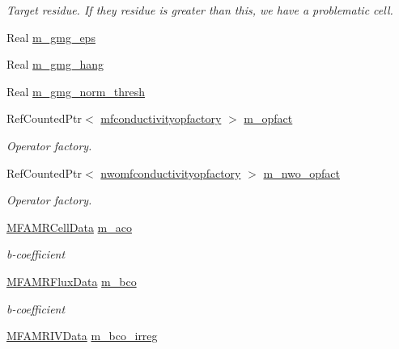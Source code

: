 \begin{DoxyCompactItemize}
\begin{DoxyCompactList}\small\item\em Target residue. If they residue is greater than this, we have a problematic cell. \end{DoxyCompactList}\item 
Real \hyperlink{classpoisson__multifluid__gmg_af494cdcc81f7f3d61ed506004aa0b1c8}{m\+\_\+gmg\+\_\+eps}
\item 
Real \hyperlink{classpoisson__multifluid__gmg_a1edc2bc1f3fab01b3913e16c05dfda6f}{m\+\_\+gmg\+\_\+hang}
\item 
Real \hyperlink{classpoisson__multifluid__gmg_aedad644585e19b2e21fa96484f74cbaa}{m\+\_\+gmg\+\_\+norm\+\_\+thresh}
\item 
Ref\+Counted\+Ptr$<$ \hyperlink{classmfconductivityopfactory}{mfconductivityopfactory} $>$ \hyperlink{classpoisson__multifluid__gmg_a477260f39846ba1eb5cd410657f9a456}{m\+\_\+opfact}
\begin{DoxyCompactList}\small\item\em Operator factory. \end{DoxyCompactList}\item 
Ref\+Counted\+Ptr$<$ \hyperlink{classnwomfconductivityopfactory}{nwomfconductivityopfactory} $>$ \hyperlink{classpoisson__multifluid__gmg_a906eb726a2928f1921e62a6a08546f35}{m\+\_\+nwo\+\_\+opfact}
\begin{DoxyCompactList}\small\item\em Operator factory. \end{DoxyCompactList}\item 
\hyperlink{type__definitions_8H_aced885351d40daa466564acbee4042d3}{M\+F\+A\+M\+R\+Cell\+Data} \hyperlink{classpoisson__multifluid__gmg_a4c4eccde9fc58ff827d47526ae240efd}{m\+\_\+aco}
\begin{DoxyCompactList}\small\item\em b-\/coefficient \end{DoxyCompactList}\item 
\hyperlink{type__definitions_8H_a4033d82364b7e6655b58257749d7881f}{M\+F\+A\+M\+R\+Flux\+Data} \hyperlink{classpoisson__multifluid__gmg_a7fff02b127ccc850b64d1ce782299c5f}{m\+\_\+bco}
\begin{DoxyCompactList}\small\item\em b-\/coefficient \end{DoxyCompactList}\item 
\hyperlink{type__definitions_8H_a559707b00625e419df1a59d9501220de}{M\+F\+A\+M\+R\+I\+V\+Data} \hyperlink{classpoisson__multifluid__gmg_a7b854b8b2557bd3d312a4cff868779fc}{m\+\_\+bco\+\_\+irreg}

\end{DoxyCompactItemize}
